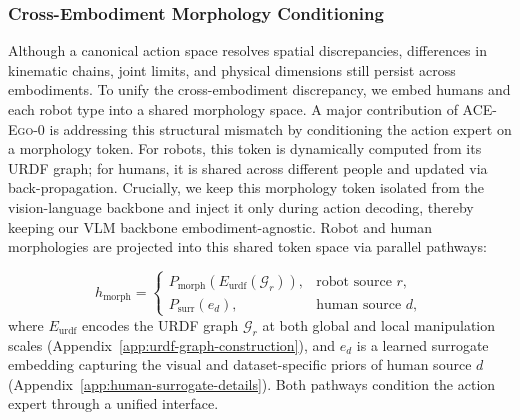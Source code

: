 \documentclass{llmxive}
\providecommand{\OURS}{\textsc{ACE-Ego-0}\xspace}
\providecommand{\Ours}{\OURS}
\begin{document}
\subsubsection{Cross-Embodiment Morphology Conditioning}
\label{sec:urdf-conditioning}

Although a canonical action space resolves spatial discrepancies, differences in kinematic chains, joint limits, and physical dimensions still persist across embodiments. To unify the cross-embodiment discrepancy, we embed humans and each robot type into a shared morphology space. A major contribution of \Ours is addressing this structural mismatch by conditioning the action expert on a morphology token. For robots, this token is dynamically computed from its URDF graph; for humans, it is shared across different people and updated via back-propagation. Crucially, we keep this morphology token isolated from the vision-language backbone and inject it only during action decoding, thereby keeping our VLM backbone embodiment-agnostic.
Robot and human morphologies are projected into this shared token space via parallel pathways:

\begin{equation}
  h_{\mathrm{morph}}
  =
  \begin{cases}
  P_{\mathrm{morph}}\!\left(E_{\mathrm{urdf}}(\mathcal{G}_{r})\right),
    & \text{robot source } r, \\[4pt]
  P_{\mathrm{surr}}(e_{d}),
    & \text{human source } d,
  \end{cases}
  \label{eq:morph-token}
\end{equation}
where $E_{\mathrm{urdf}}$ encodes the URDF graph $\mathcal{G}_r$ at both global and local manipulation scales (Appendix~\ref{app:urdf-graph-construction}), and $e_d$ is a learned surrogate embedding capturing the visual and dataset-specific priors of human source $d$ (Appendix~\ref{app:human-surrogate-details}). Both pathways condition the action expert through a unified interface.


\end{document}

